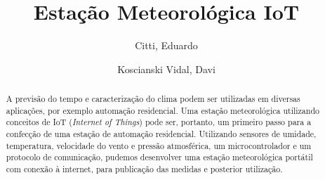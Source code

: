 \documentclass[twocolumn,11pt]{article}
\title{Estação Meteorológica IoT}
\author{Citti, Eduardo \and Koscianski Vidal, Davi}
\begin{document}
\maketitle

\tableofcontents

\begin{abstract}
A previsão do tempo e caracterização do clima podem ser utilizadas em diversas aplicações, por exemplo automação residencial. Uma estação meteorológica utilizando conceitos de IoT (\textit{Internet of Things}) pode ser, portanto, um primeiro passo para a confecção de uma estação de automação residencial.
Utilizando sensores de umidade, temperatura, velocidade do vento e pressão atmosférica, um microcontrolador e um protocolo de comunicação, pudemos desenvolver uma estação meteorológica portátil com conexão à internet, para publicação das medidas e posterior utilização.
\end{abstract}
\end{document}
